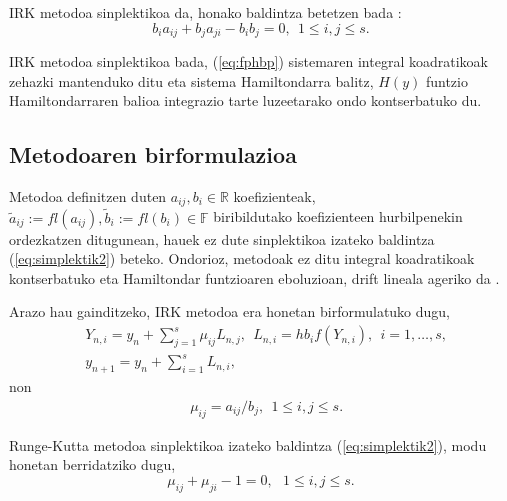 IRK metodoa sinplektikoa da, honako baldintza betetzen bada  \cite{JMSanz-Serna1994}:
\begin{equation}
\label{eq:simplektik2}
b_{i}a_{ij}+b_{j}a_{ji}-b_{i}b_{j}=0, \ \ 1 \leqslant i,j \leqslant s.
\end{equation}   

IRK metodoa sinplektikoa bada, (\ref{eq:fphbp}) sistemaren integral koadratikoak zehazki mantenduko ditu eta sistema Hamiltondarra balitz, $H(y)$ funtzio Hamiltondarraren balioa integrazio tarte luzeetarako ondo kontserbatuko du.

\subsection{Metodoaren birformulazioa}

Metodoa definitzen duten $a_{ij},b_i  \in \mathbb{R}$ koefizienteak, $\tilde a_{ij}:=fl(a_{ij}),\tilde b_i:=fl(b_i) \in \mathbb{F}$ biribildutako koefizienteen hurbilpenekin ordezkatzen ditugunean, hauek ez dute sinplektikoa izateko baldintza (\ref{eq:simplektik2}) beteko. Ondorioz, metodoak ez ditu integral koadratikoak kontserbatuko eta Hamiltondar funtzioaren eboluzioan, drift lineala ageriko da \cite{JMSanz-Serna1994}.    
  
Arazo hau gainditzeko, IRK metodoa era honetan birformulatuko dugu,
\begin{align}
\label{eq:irk1}
&Y_{n,i}=y_n+ \sum\limits_{j=1}^{s} \mu_{ij} L_{n,j},  \ \ L_{n,i}=hb_if(Y_{n,i}), \ \ i=1,\dots,s,\\
\label{eq:irk2}
&y_{n+1}=y_n+\sum\limits_{i=1}^{s} L_{n,i},
\end{align}
non 
\begin{align*}
&\mu_{ij}=a_{ij}/{b_j}, \ \ 1 \leqslant i,j \leqslant s.
\end{align*}

Runge-Kutta metodoa sinplektikoa izateko baldintza (\ref{eq:simplektik2}), modu honetan berridatziko dugu,
\begin{equation}
\label{eq:sinplekmij}
\mu_{ij}+\mu_{ji}-1=0, \ \ \ 1 \leqslant i,j \leqslant s.
\end{equation}
 
